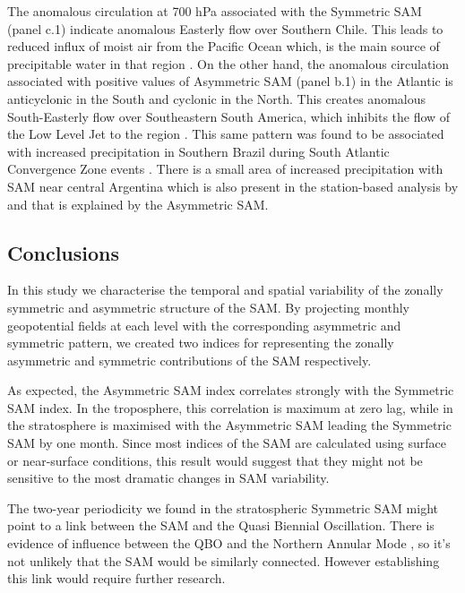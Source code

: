 \documentclass[smallextended]{svjour3}       %
\begin{document}
The anomalous circulation at 700 hPa associated with the Symmetric SAM (panel c.1) indicate anomalous Easterly flow over Southern Chile. This leads to reduced influx of moist air from the Pacific Ocean which, is the main source of precipitable water in that region \citep{garreaud2007}. On the other hand, the anomalous circulation associated with positive values of Asymmetric SAM (panel b.1) in the Atlantic is anticyclonic in the South and cyclonic in the North. This creates anomalous South-Easterly flow over Southeastern South America, which inhibits the flow of the Low Level Jet to the region \citep{silvestri2009, zamboni2010}. This same pattern was found to be associated with increased precipitation in Southern Brazil during South Atlantic Convergence Zone events \citep{rosso2018}. There is a small area of increased precipitation with SAM near central Argentina which is also present in the station-based analysis by \citet{gillett2006} and that is explained by the Asymmetric SAM.

\hypertarget{conclusions}{%
\subsection{Conclusions}\label{conclusions}}

In this study we characterise the temporal and spatial variability of the zonally symmetric and asymmetric structure of the SAM. By projecting monthly geopotential fields at each level with the corresponding asymmetric and symmetric pattern, we created two indices for representing the zonally asymmetric and symmetric contributions of the SAM respectively.

As expected, the Asymmetric SAM index correlates strongly with the Symmetric SAM index. In the troposphere, this correlation is maximum at zero lag, while in the stratosphere is maximised with the Asymmetric SAM leading the Symmetric SAM by one month. Since most indices of the SAM are calculated using surface or near-surface conditions, this result would suggest that they might not be sensitive to the most dramatic changes in SAM variability.

The two-year periodicity we found in the stratospheric Symmetric SAM might point to a link between the SAM and the Quasi Biennial Oscillation. There is evidence of influence between the QBO and the Northern Annular Mode \citep[e.g.][]{holton1980, watson2014, zhang2020}, so it's not unlikely that the SAM would be similarly connected. However establishing this link would require further research.
\end{document}
